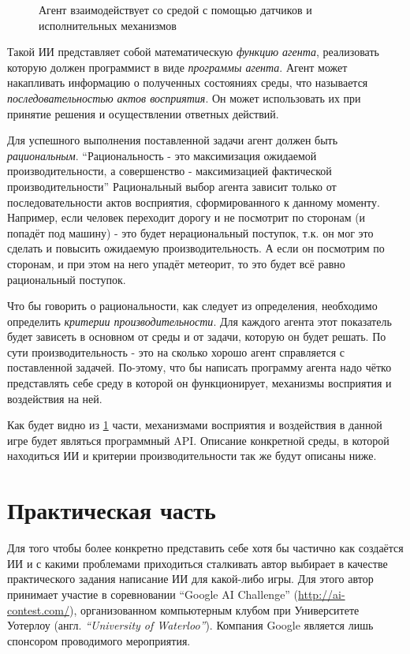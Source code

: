 \documentclass[12pt]{report}
\begin{document}
\begin{figure}[h]
	\centering
	
	\caption{Агент взаимодействует со средой с помощью датчиков и исполнительных механизмов \citep{russell1995}}
	\label{fig:agent}
\end{figure}
Такой ИИ представляет собой математическую \emph{функцию агента}, реализовать которую должен программист в виде \emph{программы агента}. Агент может накапливать информацию о полученных состояниях среды, что называется \emph{последовательностью актов восприятия}. Он может использовать их при принятие решения и осуществлении ответных действий. 

Для успешного выполнения поставленной задачи агент должен быть \emph{рациональным}. ``Рациональность - это максимизация ожидаемой производительности, а совершенство - максимизацией фактической производительности'' \citep{russell1995} Рациональный выбор агента зависит только от последовательности актов восприятия, сформированного к данному моменту. Например, если человек переходит дорогу и не посмотрит по сторонам (и попадёт под машину) - это будет нерациональный поступок, т.к. он мог это сделать и повысить ожидаемую производительность. А если он посмотрим по сторонам, и при этом на него упадёт метеорит, то это будет всё равно рациональный поступок.\citep{russell1995} 

Что бы говорить о рациональности, как следует из определения, необходимо определить \emph{критерии производительности}. Для каждого агента этот показатель будет зависеть в основном от среды и от задачи, которую он будет решать. По сути производительность - это на сколько хорошо агент справляется с поставленной задачей. По-этому, что бы написать программу агента надо чётко представлять себе среду в которой он функционирует, механизмы восприятия и воздействия на ней. 

Как будет видно из \ref{chap:practice} части, механизмами восприятия и воздействия в данной игре будет являться программный API. Описание конкретной среды, в которой находиться ИИ и критерии производительности так же будут описаны ниже.


\chapter{Практическая часть}
\label{chap:practice}
\thispagestyle{fancy}
Для того чтобы более конкретно представить себе хотя бы частично как создаётся ИИ и с какими проблемами приходиться сталкивать автор выбирает в качестве практического задания написание ИИ для какой-либо игры. Для этого автор принимает участие в соревновании ``Google AI Challenge'' (\url{http://ai-contest.com/}), организованном компьютерным клубом при Университете Уотерлоу (англ. \emph{``University of Waterloo''}). Компания Google является лишь спонсором проводимого мероприятия. \citep{AIChallangeFAQ} 
\end{document}
